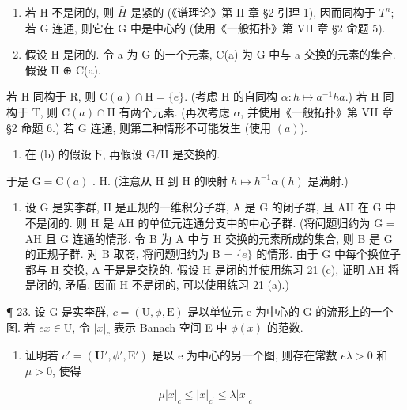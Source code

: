\begin{enumerate}
\def\labelenumi{(\alph{enumi})}
\item
  若 H 不是闭的, 则 \(\bar{H}\) 是紧的 (《谱理论》第 II 章 §2 引理 1), 因而同构于 \(T^{n}\); 若 G 连通, 则它在 G 中是中心的 (使用《一般拓扑》第 VII 章 §2 命题 5).
\item
  假设 H 是闭的. 令 a 为 G 的一个元素, C(a) 为 G 中与 a 交换的元素的集合. 假设 H ⊕ C(a).
\end{enumerate}

若 H 同构于 R, 则 \(\mathrm{C}(a) \cap \mathrm{H} = \{e\}\). (考虑 H 的自同构 \(\alpha: h \mapsto a^{-1}ha\).) 若 H 同构于 T, 则 \(\mathrm{C}(a) \cap \mathrm{H}\) 有两个元素. (再次考虑 \(\alpha\), 并使用《一般拓扑》第 VII 章 §2 命题 6.) 若 G 连通, 则第二种情形不可能发生 (使用 \((a)\)).

\begin{enumerate}
\def\labelenumi{(\alph{enumi})}
\setcounter{enumi}{2}
\tightlist
\item
  在 (b) 的假设下, 再假设 G/H 是交换的.
\end{enumerate}

于是 \(\mathrm{G} = \mathrm{C}(a)\) . H. (注意从 H 到 H 的映射 \(h \mapsto h^{-1}\alpha(h)\) 是满射.)

\begin{enumerate}
\def\labelenumi{\arabic{enumi}.}
\setcounter{enumi}{21}
\tightlist
\item
  设 G 是实李群, H 是正规的一维积分子群, A 是 G 的闭子群, 且 AH 在 G 中不是闭的. 则 H 是 AH 的单位元连通分支中的中心子群. (将问题归约为 G = AH 且 G 连通的情形. 令 B 为 A 中与 H 交换的元素所成的集合, 则 B 是 G 的正规子群. 对 B 取商, 将问题归约为 B = \(\{e\}\) 的情形. 由于 G 中每个换位子都与 H 交换, A 于是是交换的. 假设 H 是闭的并使用练习 21 (c), 证明 AH 将是闭的, 矛盾. 因而 H 不是闭的, 可以使用练习 21 (a).)
\end{enumerate}

¶ 23. 设 G 是实李群, \(c = (\mathrm{U}, \phi, \mathrm{E})\) 是以单位元 e 为中心的 G 的流形上的一个图. 若 \(e\)\(x \in \mathrm{U}\), 令 \(|x|_c\) 表示 Banach 空间 E 中 \(\phi(x)\) 的范数.

\begin{enumerate}
\def\labelenumi{(\alph{enumi})}
\tightlist
\item
  证明若 \(c' = (\mathbf{U}', \phi', \mathrm{E}')\) 是以 e 为中心的另一个图, 则存在常数 \(e\)\(\lambda > 0\) 和 \(\mu > 0\), 使得
\end{enumerate}

\[
\mu | x | _ {c} \leqslant | x | _ {c ^ {\prime}} \leqslant \lambda | x | _ {c}
\]

